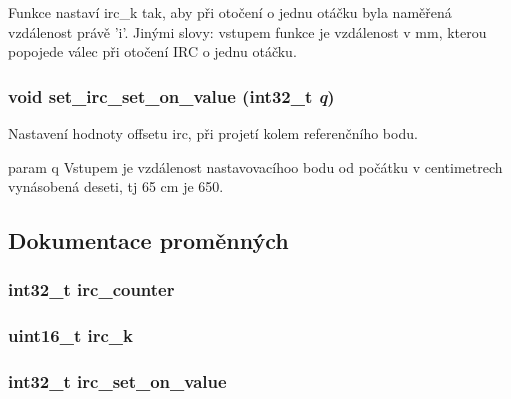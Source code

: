 Funkce nastaví irc\_\-k tak, aby při otočení o jednu otáčku byla naměřená vzdálenost právě 'i'. Jinými slovy: vstupem funkce je vzdálenost v mm, kterou popojede válec při otočení IRC o jednu otáčku. 
\subsubsection{\setlength{\rightskip}{0pt plus 5cm}void set\_\-irc\_\-set\_\-on\_\-value (int32\_\-t {\em q})}\label{irc_8h_e8649f1f08cf3f0a6cc0d3e55eac5e21}


Nastavení hodnoty offsetu irc, při projetí kolem referenčního bodu.

param q Vstupem je vzdálenost nastavovacíhoo bodu od počátku v centimetrech vynásobená deseti, tj 65 cm je 650. 

\subsection{Dokumentace proměnných}
\subsubsection{\setlength{\rightskip}{0pt plus 5cm}int32\_\-t {\bf irc\_\-counter}}\label{irc_8h_2420ea5087a6c97e0f0e60946bb6bed2}


\subsubsection{\setlength{\rightskip}{0pt plus 5cm}uint16\_\-t {\bf irc\_\-k}}\label{irc_8h_2823da0ac1f311c8b12078b236bbeb67}


\subsubsection{\setlength{\rightskip}{0pt plus 5cm}int32\_\-t {\bf irc\_\-set\_\-on\_\-value}}\label{irc_8h_ce11bc81992ca3824a4fb55ff1d5b47b}


